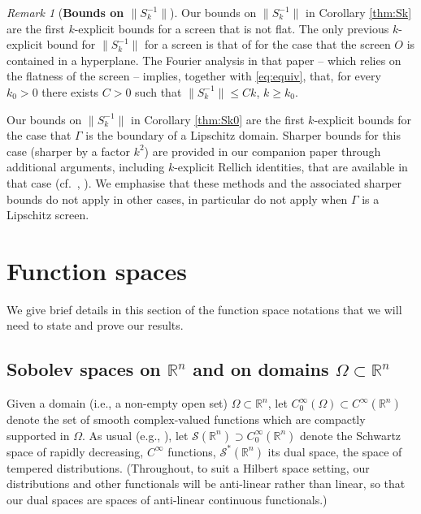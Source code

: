 \documentclass{birkjour}
\theoremstyle{definition}
\theoremstyle{remark}
\newtheorem{remark}[theorem]{Remark}
\numberwithin{equation}{section}
\newcommand{\R}{\mathbb{R}}
\newcommand{\cS}{\mathcal{S}}
\newcommand{\cH}{\mathcal{H}}
\newcommand{\cD}{\mathcal{D}}
\begin{document}
\begin{remark}[\bf Bounds on $\|S_k^{-1}\|$]
Our bounds on $\|S_k^{-1}\|$ in Corollary \ref{thm:Sk} are the first $k$-explicit bounds for  a screen that is not flat. The only previous $k$-explicit bound for $\|S_k^{-1}\|$ for a screen is that of \cite{CWHewett2015} for the case that the screen $O$ is contained in a hyperplane. The Fourier analysis in that paper \cite[Thm.~1.7]{CWHewett2015} -- which relies on the flatness of the screen -- implies, together with \eqref{eq:equiv}, that, for every $k_0>0$ there exists $C>0$ such that  $\|S_k^{-1}\|\leq Ck$, $k\geq k_0$. 

Our bounds on $\|S_k^{-1}\|$ in Corollary \ref{thm:Sk0} are the first $k$-explicit bounds for the case that $\Gamma$ is the boundary of a Lipschitz domain. Sharper bounds for this case (sharper by a factor $k^2$) are provided in our companion paper \cite{SiavashSimon1} through additional arguments, including $k$-explicit Rellich identities, that are available in that case  (cf.~\cite[\S3.3]{spence2014wavenumber}, \cite[\S4.2]{chandler2020high}). We emphasise that these methods and the associated sharper bounds do not apply in other cases, in particular do not apply when $\Gamma$ is a Lipschitz screen.
\end{remark}







\section{Function spaces} \label{sec:fs}
We give brief details in this section of the function space notations that we will need to state and prove our results.

\subsection{Sobolev spaces on $\R^n$ and on domains $\Omega\subset \R^n$} \label{sec:fsRn}
Given a domain (i.e., a non-empty open set) $\Omega\subset\mathbb{R}^n$, let $C_0^\infty(\Omega)\subset C^\infty(\R^n)$ denote the set of smooth complex-valued functions which are compactly supported in $\Omega$. %
As usual (e.g., \cite{mclean2000strongly}), let $\cS(\R^n)\supset C_0^\infty(\R^n)$ denote the Schwartz space of rapidly decreasing, $C^\infty$ functions, $\cS^*(\R^n)$ its dual space, the space of tempered distributions. (Throughout, to suit a Hilbert space setting, our distributions and other functionals will be anti-linear rather than linear, so that our dual spaces are spaces of anti-linear continuous functionals.) 
\end{document}

